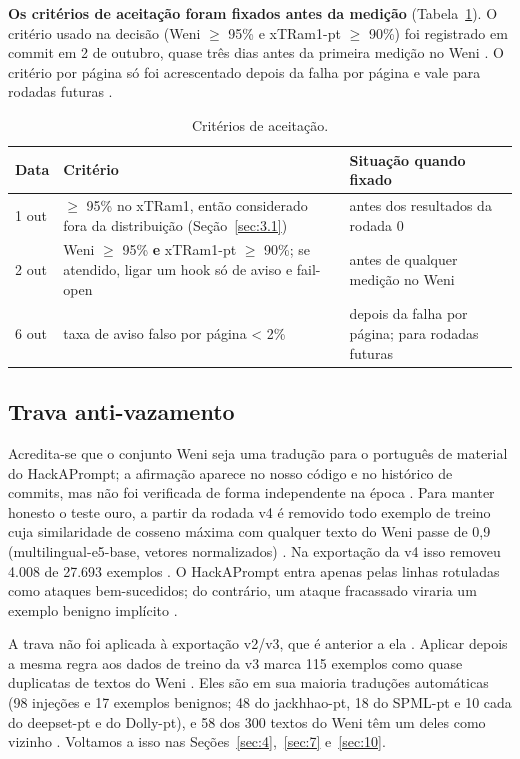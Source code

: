 \documentclass[11pt]{article}
\begin{document}
\textbf{Os critérios de aceitação foram fixados antes da medição} (Tabela~\ref{tab:2}). O critério usado na decisão (Weni \ensuremath{\geq} 95\% e xTRam1-pt \ensuremath{\geq} 90\%) foi registrado em commit em 2 de outubro, quase três dias antes da primeira medição no Weni%
. O critério por página só foi acrescentado depois da falha por página e vale para rodadas futuras%
.

\begin{table}[tbp]
\centering
\small
\caption{Critérios de aceitação.}\label{tab:2}
\begin{tabularx}{\linewidth}{@{}l>{\raggedright\arraybackslash\hsize=1.23\hsize}X>{\raggedright\arraybackslash\hsize=0.77\hsize}X@{}}
\toprule
Data & Critério & Situação quando fixado \\
\midrule
1 out & \ensuremath{\geq} 95\% no xTRam1, então considerado fora da distribuição (Seção~\ref{sec:3.1}) %
 & antes dos resultados da rodada 0 \\
2 out & Weni \ensuremath{\geq} 95\% \textbf{e} xTRam1-pt \ensuremath{\geq} 90\%; se atendido, ligar um hook só de aviso e fail-open %
 & antes de qualquer medição no Weni \\
6 out & taxa de aviso falso por página \textless{} 2\% %
 & depois da falha por página; para rodadas futuras \\
\bottomrule
\end{tabularx}
\end{table}

\subsection{Trava anti-vazamento}\label{sec:3.4}

Acredita-se que o conjunto Weni seja uma tradução para o português de material do HackAPrompt; a afirmação aparece no nosso código e no histórico de commits, mas não foi verificada de forma independente na época%
. Para manter honesto o teste ouro, a partir da rodada v4 é removido todo exemplo de treino cuja similaridade de cosseno máxima com qualquer texto do Weni passe de 0,9 (multilingual-e5-base, vetores normalizados)%
. Na exportação da v4 isso removeu 4.008 de 27.693 exemplos%
. O HackAPrompt entra apenas pelas linhas rotuladas como ataques bem-sucedidos; do contrário, um ataque fracassado viraria um exemplo benigno implícito%
.

A trava não foi aplicada à exportação v2/v3, que é anterior a ela%
. Aplicar depois a mesma regra aos dados de treino da v3 marca 115 exemplos como quase duplicatas de textos do Weni%
. Eles são em sua maioria traduções automáticas (98 injeções e 17 exemplos benignos; 48 do jackhhao-pt, 18 do SPML-pt e 10 cada do deepset-pt e do Dolly-pt), e 58 dos 300 textos do Weni têm um deles como vizinho%
. Voltamos a isso nas Seções~\ref{sec:4},~\ref{sec:7} e~\ref{sec:10}.
\end{document}
